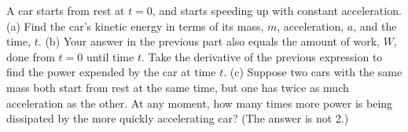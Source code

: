  A car starts from rest at $t=0$, and starts speeding
up with constant acceleration. (a) Find the car's kinetic
energy in terms of its mass, $m$, acceleration, $a$, and the
time, $t$. (b) Your answer in the previous part also equals
the amount of work, $W$, done from $t=0$ until time $t$.
Take the derivative of the previous expression to find the
power expended by the car at time $t$. (c) Suppose two cars
with the same mass both start from rest at the same time,
but one has twice as much acceleration as the other. At any
moment, how many times more power is being dissipated by the
more quickly accelerating car? (The answer is not 2.)
\answercheck
